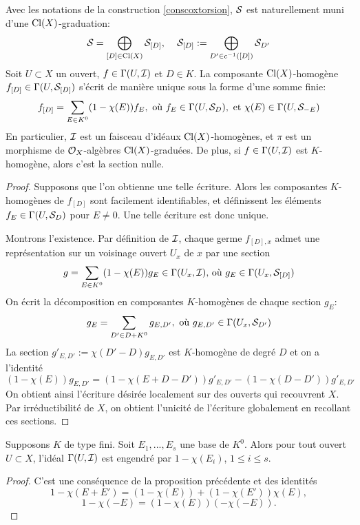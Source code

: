 \begin{prop}\label{coxidealform}
Avec les notations de la construction \ref{conscoxtorsion}, $\mathcal{S}$ est naturellement muni d'une $\operatorname{Cl}(X)$-graduation:
$$\mathcal{S}=\bigoplus_{[D]\in\operatorname{Cl}(X)}\mathcal{S}_{[D]},\,\,\,\,\,\,\, \mathcal{S}_{[D]}:=\bigoplus_{D'\in c^{-1}([D])}\mathcal{S}_{D'}$$
Soit $U\subset X$ un ouvert, $f\in\Gamma(U,\mathcal{I})$ et $D\in K$. La composante $\operatorname{Cl}(X)$-homogène $f_{[D]}\in \Gamma(U,\mathcal{S}_{[D]})$ s'écrit de manière unique sous la forme d'une somme finie:
$$f_{[D]}=\sum_{E\in K^0}(1-\chi(E))f_E, \text{  où } f_E\in\Gamma(U,\mathcal{S}_D), \text{ et }\chi(E)\in \Gamma(U, \mathcal{S}_{-E})$$
En particulier, $\mathcal{I}$ est un faisceau d'idéaux $\operatorname{Cl}(X)$-homogènes, et $\pi$ est un morphisme de $\mathcal{O}_X$-algèbres $\operatorname{Cl}(X)$-graduées. De plus, si $f\in \Gamma(U,\mathcal{I})$ est $K$-homogène, alors c'est la section nulle.
\end{prop}
\begin{proof}
Supposons que l'on obtienne une telle écriture. Alors les composantes $K$-homogènes de $f_{[D]}$ sont facilement identifiables, et définissent les éléments $f_E\in\Gamma(U,\mathcal{S}_D)$ pour $E\neq 0$. Une telle écriture est donc unique.

Montrons l'existence. Par définition de $\mathcal{I}$, chaque germe $f_{[D],x}$ admet une représentation sur un voisinage ouvert $U_x$ de $x$ par une section 
$$g=\sum_{E\in K^0}(1-\chi(E))g_E \in \Gamma(U_x, \mathcal{I})\text{, où }g_E\in \Gamma(U_x, \mathcal{S}_{[D]})$$
On écrit la décomposition en composantes $K$-homogènes de chaque section $g_E$:
$$g_E=\sum_{D'\in D+K^0}g_{E,D'}, \text{ où } g_{E,D'}\in\Gamma(U_x, \mathcal{S}_{D'})$$
La section $g'_{E,D'}:=\chi(D'-D)g_{E,D'}$ est $K$-homogène de degré $D$ et on a l'identité 
$$(1-\chi(E))g_{E,D'}=(1-\chi(E+D-D'))g'_{E,D'}-(1-\chi(D-D'))g'_{E,D'}$$
On obtient ainsi l'écriture désirée localement sur des ouverts qui recouvrent $X$. Par irréductibilité de $X$, on obtient l'unicité de l'écriture globalement en recollant ces sections.
\end{proof}

\begin{cor}\label{genreatorsCoxIdeal}
Supposons $K$ de type fini. Soit $E_1,...,E_s$ une base de $K^0$. Alors pour tout ouvert $U\subset X$, l'idéal $\Gamma(U,\mathcal{I})$ est engendré par $1-\chi(E_i)$, $1\leq i\leq s$.
\end{cor}
\begin{proof}
C'est une conséquence de la proposition précédente et des identités
$$1-\chi(E+E')=(1-\chi(E))+(1-\chi(E'))\chi(E),$$
$$1-\chi(-E)=(1-\chi(E))(-\chi(-E)).$$
\end{proof}

